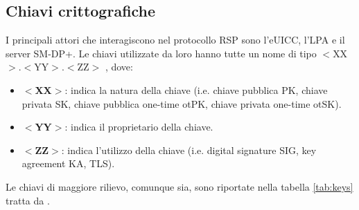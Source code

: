 \documentclass[10pt, twoside, openany]{book}
\begin{document}
\subsection{Chiavi crittografiche}
I principali attori che interagiscono nel protocollo RSP sono l'eUICC, l'LPA e il server SM-DP+. Le chiavi utilizzate da loro hanno tutte un nome di tipo $<$XX$>$.$<$YY$>$.$<$ZZ$>$ \cite{GSMA-docs-new}, dove:
\begin{itemize}
\item \textbf{$<$XX$>$}: indica la natura della chiave (i.e. chiave pubblica PK, chiave privata SK, chiave pubblica one-time otPK, chiave privata one-time otSK).
\item \textbf{$<$YY$>$}: indica il proprietario della chiave.
\item \textbf{$<$ZZ$>$}: indica l'utilizzo della chiave (i.e. digital signature SIG, key agreement KA, TLS).
\end{itemize}
Le chiavi di maggiore rilievo, comunque sia, sono riportate nella tabella \ref{tab:keys} tratta da \cite{GSMA-docs-old}.
\end{document}
